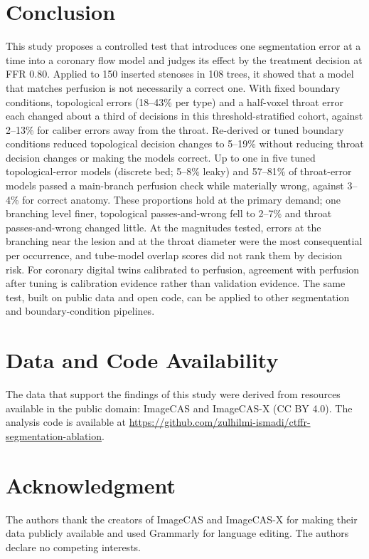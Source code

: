 \documentclass[journal,twoside,web]{ieeecolor}
\begin{document}
\section{Conclusion}
This study proposes a controlled test that introduces one segmentation error at a time into a coronary flow model and judges
its effect by the treatment decision at FFR 0.80. Applied to 150 inserted stenoses in 108 trees, it showed that a model that matches
perfusion is not necessarily a correct one. With fixed boundary conditions, topological errors (18--43\% per type) and a half-voxel throat error each changed about a third of decisions in this threshold-stratified cohort, against 2--13\% for caliber errors away from the throat. Re-derived or tuned boundary conditions reduced topological decision changes to 5--19\% without reducing throat decision changes or making the models correct. Up to one in five tuned topological-error models (discrete bed; 5--8\% leaky) and 57--81\% of throat-error models passed a main-branch perfusion check while materially wrong, against 3--4\% for correct anatomy. These proportions hold at the primary demand; one branching level finer, topological passes-and-wrong fell to 2--7\% and throat passes-and-wrong changed little. At the magnitudes tested, errors at the branching near the lesion and at the throat diameter were the most consequential per occurrence, and tube-model overlap scores did not rank them by decision risk.
For coronary digital twins calibrated to perfusion, agreement with perfusion after tuning is calibration evidence
rather than validation evidence. The same test, built on public data and open code, can be applied to other segmentation and
boundary-condition pipelines.

\section*{Data and Code Availability}
The data that support the findings of this study were derived from resources available in the public domain: ImageCAS \cite{zeng2023} and ImageCAS-X \cite{imagecasx_data} (CC BY 4.0). The analysis code is available at \url{https://github.com/zulhilmi-ismadi/ctffr-segmentation-ablation}.

\section*{Acknowledgment}
The authors thank the creators of ImageCAS and ImageCAS-X for making their data publicly available and used Grammarly for language editing. The authors declare no competing interests.



\end{document}
